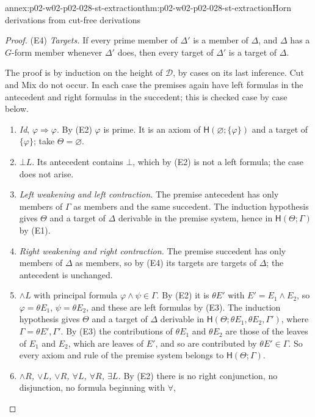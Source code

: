\begin{annexitem}{annex:p02-w02-p02-028-st-extraction}{thm:p02-w02-p02-028-st-extraction}{Horn derivations from cut-free derivations}
\begin{proof}
(E4) \emph{Targets.}  If every prime member of \(\Delta'\) is a member of
\(\Delta\), and \(\Delta\) has a \(G\)-form member whenever \(\Delta'\) does,
then every target of \(\Delta'\) is a target of \(\Delta\).

The proof is by induction on the height of \(\mathcal D\), by cases on its
last inference.  Cut and Mix do not occur.  In each case the premises again
have left formulas in the antecedent and right formulas in the succedent; this
is checked case by case below.
\begin{enumerate}
  \item \emph{Id}, \(\varphi\Rightarrow\varphi\).  By (E2) \(\varphi\) is
        prime.  It is an axiom of \(\mathsf H(\varnothing;\{\varphi\})\) and
        a target of \(\{\varphi\}\); take \(\Theta=\varnothing\).
  \item \emph{\(\bot L\)}.  Its antecedent contains \(\bot\), which by (E2)
        is not a left formula; the case does not arise.
  \item \emph{Left weakening and left contraction.}  The premise antecedent
        has only members of \(\Gamma\) as members and the same succedent.  The
        induction hypothesis gives \(\Theta\) and a target of \(\Delta\)
        derivable in the premise system, hence in
        \(\mathsf H(\Theta;\Gamma)\) by (E1).
  \item \emph{Right weakening and right contraction.}  The premise succedent
        has only members of \(\Delta\) as members, so by (E4) its targets are
        targets of \(\Delta\); the antecedent is unchanged.
  \item \emph{\(\land L\)} with principal formula \(\varphi\land\psi\in\Gamma\).
        By (E2) it is \(\theta E'\) with \(E'=E_1\land E_2\), so
        \(\varphi=\theta E_1\), \(\psi=\theta E_2\), and these are left
        formulas by (E3).  The induction hypothesis gives \(\Theta\) and a
        target of \(\Delta\) derivable in
        \(\mathsf H(\Theta;\theta E_1,\theta E_2,\Gamma')\), where
        \(\Gamma=\theta E',\Gamma'\).  By (E3) the contributions of
        \(\theta E_1\) and \(\theta E_2\) are those of the leaves of \(E_1\)
        and \(E_2\), which are leaves of \(E'\), and so are contributed by
        \(\theta E'\in\Gamma\).  So every axiom and rule of the premise system
        belongs to \(\mathsf H(\Theta;\Gamma)\).
  \item \emph{\(\land R\), \(\lor L\), \(\lor R\), \(\forall L\),
        \(\forall R\), \(\exists L\).}  By (E2) there is no right
        conjunction, no disjunction, no formula beginning with \(\forall\),

\end{enumerate}
\end{proof}
\end{annexitem}
